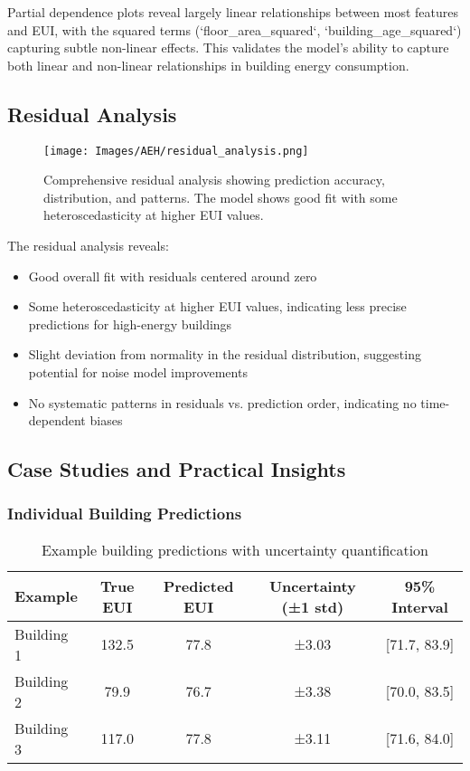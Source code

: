 Partial dependence plots reveal largely linear relationships between most features and EUI, with the squared terms (`floor\_area\_squared`, `building\_age\_squared`) capturing subtle non-linear effects. This validates the model's ability to capture both linear and non-linear relationships in building energy consumption.

\subsection{Residual Analysis}

\begin{figure}[ht]
    \centering
    \texttt{[image: Images/AEH/residual\_analysis.png]}
    \caption{Comprehensive residual analysis showing prediction accuracy, distribution, and patterns. The model shows good fit with some heteroscedasticity at higher EUI values.}
    \label{fig:residual_analysis}
\end{figure}

The residual analysis reveals:
\begin{itemize}
    \item Good overall fit with residuals centered around zero
    \item Some heteroscedasticity at higher EUI values, indicating less precise predictions for high-energy buildings
    \item Slight deviation from normality in the residual distribution, suggesting potential for noise model improvements
    \item No systematic patterns in residuals vs. prediction order, indicating no time-dependent biases
\end{itemize}

\subsection{Case Studies and Practical Insights}

\subsubsection{Individual Building Predictions}

\begin{table}[H]
    \centering
    \caption{Example building predictions with uncertainty quantification}
    \label{tab:building_examples}
    \begin{tabular}{lcccc}
        \toprule
        \textbf{Example} & \textbf{True EUI} & \textbf{Predicted EUI} & \textbf{Uncertainty (±1 std)} & \textbf{95\% Interval} \\
        \midrule
        Building 1 & 132.5 & 77.8 & ±3.03 & [71.7, 83.9] \\
        Building 2 & 79.9 & 76.7 & ±3.38 & [70.0, 83.5] \\
        Building 3 & 117.0 & 77.8 & ±3.11 & [71.6, 84.0] \\
        \bottomrule
    \end{tabular}
\end{table}

